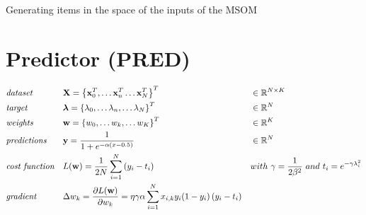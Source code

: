 \documentclass[a4paper]{article}
\begin{document}
\IncMargin{1em}
\begin{algorithm}[H]
\DontPrintSemicolon
{}




\BlankLine

\BlankLine

\caption{Generating items in the space of the inputs of the MSOM}\label{generate}
\end{algorithm}
\DecMargin{1em}

\pagebreak
\section*{Predictor (PRED)}
\begin{align}
	& \emph{dataset} &&
    \mathbf{X} = \left\{\mathbf{x}^T_0, 
    \dots\mathbf{x}^T_n \dots\mathbf{x}^T_N\right\}^T &&
    \in \mathbb{R}^{N\times K} \nonumber\\
    & \emph{target} && 
    \boldsymbol{\lambda} = \left\{\lambda_0, \dots\lambda_n, \dots 
    \lambda_N\right\}^T&&\in\mathbb{R}^N \nonumber \\
    & \emph{weights} && 
    \mathbf{w} = \left\{w_0, \dots w_k, \dots w_K\right\}^T && 
    \in \mathbb{R}^K\nonumber\\
	& \emph{predictions} && 
    \mathbf{y} = \frac{1}{1 + e^{-\alpha(x-0.5)}} &&
    \in \mathbb{R}^{N} \nonumber\\
    & \emph{cost function} && 
    L(\mathbf{w}) = \frac{1}{2N}\sum_{i=1}^N 
    {\left(y_i - t_i\right)} && 
    with\ \gamma = \frac{1}{2\beta^2}\ and\ t_i = 
    e^{-\gamma\lambda_i^2}\nonumber\\
    & \emph{gradient} && 
    \Delta w_k = \frac{\partial{L(\mathbf{w})}}
    {\partial{w_k}} = \eta\gamma\alpha
    \sum_{i=1}^N x_{i, k} y_i(1-y_i)
    \left(y_i - t_i\right) \nonumber
\end{align}
\end{document}
